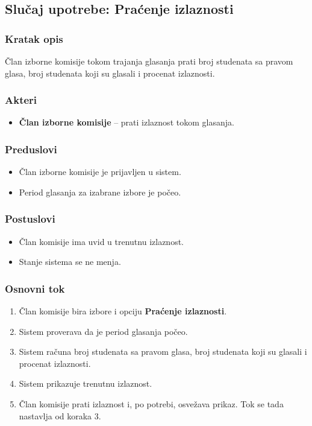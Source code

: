 \subsection{Slučaj upotrebe: Praćenje izlaznosti}

\subsubsection*{Kratak opis}
Član izborne komisije tokom trajanja glasanja prati broj studenata sa pravom glasa, broj studenata koji su glasali i procenat izlaznosti.

\subsubsection*{Akteri}
\begin{itemize}
    \item \textbf{Član izborne komisije} -- prati izlaznost tokom glasanja.
\end{itemize}

\subsubsection*{Preduslovi}
\begin{itemize}
    \item Član izborne komisije je prijavljen u sistem.
    \item Period glasanja za izabrane izbore je počeo.
\end{itemize}

\subsubsection*{Postuslovi}
\begin{itemize}
    \item Član komisije ima uvid u trenutnu izlaznost.
    \item Stanje sistema se ne menja.
\end{itemize}

\subsubsection*{Osnovni tok}
\begin{enumerate}
    \item Član komisije bira izbore i opciju \textbf{Praćenje izlaznosti}.
    \item Sistem proverava da je period glasanja počeo.
    \item Sistem računa broj studenata sa pravom glasa, broj studenata koji su glasali i procenat izlaznosti.
    \item Sistem prikazuje trenutnu izlaznost.
    \item Član komisije prati izlaznost i, po potrebi, osvežava prikaz. Tok se tada nastavlja od koraka 3.
\end{enumerate}

